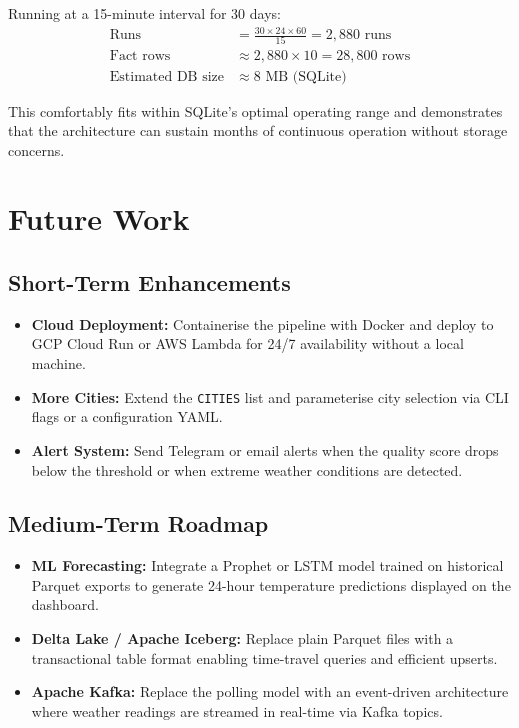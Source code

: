 \documentclass[12pt,a4paper]{report}
\begin{document}
Running at a 15-minute interval for 30 days:
\begin{align*}
  \text{Runs} &= \frac{30 \times 24 \times 60}{15} = 2{,}880 \text{ runs}\\
  \text{Fact rows} &\approx 2{,}880 \times 10 = 28{,}800 \text{ rows}\\
  \text{Estimated DB size} &\approx 8\text{ MB (SQLite)}
\end{align*}

This comfortably fits within SQLite's optimal operating range and demonstrates that the architecture can sustain months of continuous operation without storage concerns.

\chapter{Future Work}

\section{Short-Term Enhancements}

\begin{itemize}
  \item \textbf{Cloud Deployment:} Containerise the pipeline with Docker and deploy to GCP Cloud Run or AWS Lambda for 24/7 availability without a local machine.
  \item \textbf{More Cities:} Extend the \texttt{CITIES} list and parameterise city selection via CLI flags or a configuration YAML.
  \item \textbf{Alert System:} Send Telegram or email alerts when the quality score drops below the threshold or when extreme weather conditions are detected.
\end{itemize}

\section{Medium-Term Roadmap}

\begin{itemize}
  \item \textbf{ML Forecasting:} Integrate a Prophet or LSTM model trained on historical Parquet exports to generate 24-hour temperature predictions displayed on the dashboard.
  \item \textbf{Delta Lake / Apache Iceberg:} Replace plain Parquet files with a transactional table format enabling time-travel queries and efficient upserts.
  \item \textbf{Apache Kafka:} Replace the polling model with an event-driven architecture where weather readings are streamed in real-time via Kafka topics.
\end{itemize}
\end{document}
